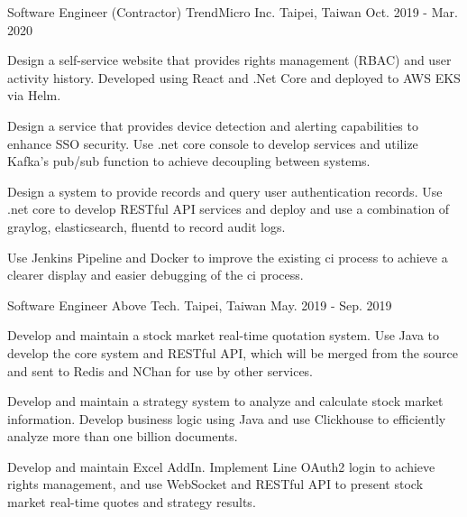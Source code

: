 \begin{cventries}
\cventry
{Software Engineer (Contractor)} %
{TrendMicro Inc.} %
{Taipei, Taiwan} %
{Oct. 2019 - Mar. 2020} %
{
  \begin{cvitems} %
    \item {Design a self-service website that provides rights management (RBAC) and user activity history. Developed using React and .Net Core and deployed to AWS EKS via Helm.}
    \item {Design a service that provides device detection and alerting capabilities to enhance SSO security. Use .net core console to develop services and utilize Kafka's pub/sub function to achieve decoupling between systems.}
    \item {Design a system to provide records and query user authentication records. Use .net core to develop RESTful API services and deploy and use a combination of graylog, elasticsearch, fluentd to record audit logs.}
    \item {Use Jenkins Pipeline and Docker to improve the existing ci process to achieve a clearer display and easier debugging of the ci process.}
  \end{cvitems}
}

\cventry
{Software Engineer} %
{Above Tech.} %
{Taipei, Taiwan} %
{May. 2019 - Sep. 2019} %
{
  \begin{cvitems} %
    \item {Develop and maintain a stock market real-time quotation system. Use Java to develop the core system and RESTful API, which will be merged from the source and sent to Redis and NChan for use by other services.}
    \item {Develop and maintain a strategy system to analyze and calculate stock market information. Develop business logic using Java and use Clickhouse to efficiently analyze more than one billion documents.}
    \item {Develop and maintain Excel AddIn. Implement Line OAuth2 login to achieve rights management, and use WebSocket and RESTful API to present stock market real-time quotes and strategy results.}
  \end{cvitems}
}


\end{cventries}
